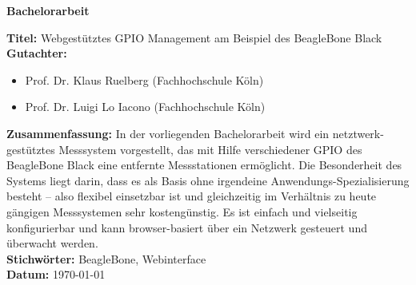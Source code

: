 \begin{center}
	\textbf{Bachelorarbeit}
\end{center}

\noindent \textbf{Titel:} Webgestütztes GPIO Management am Beispiel des BeagleBone Black\\

\noindent \textbf{Gutachter:}
\begin{itemize}
	\item Prof. Dr. Klaus Ruelberg (Fachhochschule Köln)
	\item Prof. Dr. Luigi Lo Iacono (Fachhochschule Köln)
\end{itemize}

\noindent \textbf{Zusammenfassung:} In der vorliegenden Bachelorarbeit wird ein netztwerk-gestütztes Messsystem vorgestellt, das mit Hilfe verschiedener GPIO des BeagleBone Black eine entfernte Messstationen ermöglicht. Die Besonderheit des Systems liegt darin, dass es als Basis ohne irgendeine Anwendungs-Spezialisierung besteht – also flexibel einsetzbar ist und gleichzeitig im Verhältnis zu heute gängigen Messsystemen sehr kostengünstig.  Es ist einfach und vielseitig konfigurierbar und kann browser-basiert über ein Netzwerk gesteuert und überwacht werden.\\

\noindent \textbf{Stichwörter:} BeagleBone, Webinterface\\
\noindent \textbf{Datum:} {\longdate \today}
